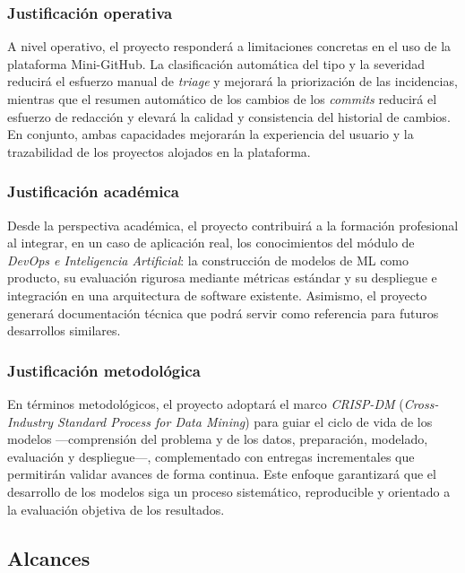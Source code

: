 \subsubsection{Justificación operativa}

A nivel operativo, el proyecto responderá a limitaciones concretas en el uso de la plataforma Mini-GitHub. La clasificación automática del tipo y la severidad reducirá el esfuerzo manual de \textit{triage} y mejorará la priorización de las incidencias, mientras que el resumen automático de los cambios de los \textit{commits} reducirá el esfuerzo de redacción y elevará la calidad y consistencia del historial de cambios. En conjunto, ambas capacidades mejorarán la experiencia del usuario y la trazabilidad de los proyectos alojados en la plataforma.

\subsubsection{Justificación académica}

Desde la perspectiva académica, el proyecto contribuirá a la formación profesional al integrar, en un caso de aplicación real, los conocimientos del módulo de \textit{DevOps e Inteligencia Artificial}: la construcción de modelos de \acrshort{ML} como producto, su evaluación rigurosa mediante métricas estándar y su despliegue e integración en una arquitectura de software existente. Asimismo, el proyecto generará documentación técnica que podrá servir como referencia para futuros desarrollos similares.

\subsubsection{Justificación metodológica}

En términos metodológicos, el proyecto adoptará el marco \textit{CRISP-DM} (\textit{Cross-Industry Standard Process for Data Mining}) para guiar el ciclo de vida de los modelos —comprensión del problema y de los datos, preparación, modelado, evaluación y despliegue—, complementado con entregas incrementales que permitirán validar avances de forma continua. Este enfoque garantizará que el desarrollo de los modelos siga un proceso sistemático, reproducible y orientado a la evaluación objetiva de los resultados.


\subsection{Alcances}

